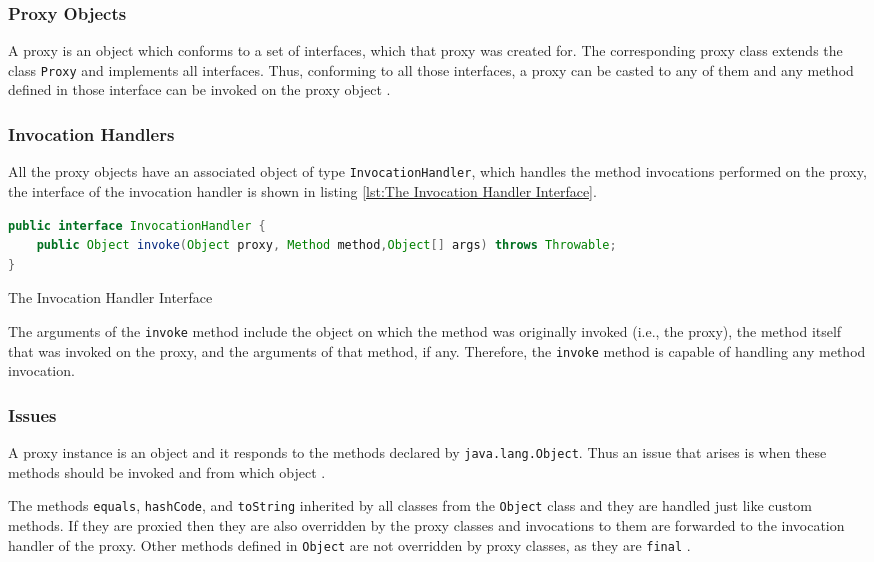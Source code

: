 \subsubsection{Proxy Objects}\label{Proxy Objects}
A proxy is an object which conforms to a set of interfaces, which that proxy was created for. 
The corresponding proxy class extends the class \texttt{Proxy} and implements all interfaces.
Thus, conforming to all those interfaces, a proxy can be casted to any of them and any method defined in those interface can be invoked on the proxy object \cite{eugster2006uniform}.

\subsubsection{Invocation Handlers}\label{Invocation Handlers}
All the proxy objects have an associated object of type \texttt{InvocationHandler}, which handles the method invocations performed on the proxy, the interface of the invocation handler is shown in listing \ref{lst:The Invocation Handler Interface}.

\begin{sourcecode}
	\begin{lstlisting}[language=Java]
public interface InvocationHandler {
	public Object invoke(Object proxy, Method method,Object[] args) throws Throwable;
}		
	\end{lstlisting}
	\caption{The Invocation Handler Interface}
	\label{lst:The Invocation Handler Interface}
\end{sourcecode}

The arguments of the \texttt{invoke} method include the object on which the method was originally invoked (i.e., the proxy), the method itself that was invoked on the proxy, and the arguments of that method, if any.
Therefore, the \texttt{invoke} method is capable of handling any method invocation.

\subsubsection{Issues}\label{Dynamic Proxies Issues}
A proxy instance is an object and it responds to the methods declared by \texttt{java.lang.Object}. 
Thus an issue that arises is when these methods should be invoked and from which object \cite{forman2004java}.

The methods \texttt{equals}, \texttt{hashCode}, and \texttt{toString} inherited by all classes from the \texttt{Object} class and they are handled just like custom methods.
If they are proxied then they are also overridden by the proxy classes and invocations to them are forwarded to the invocation handler of the proxy. 
Other methods defined in \texttt{Object} are not overridden by proxy classes, as they are \texttt{final} \cite{eugster2006uniform}.

